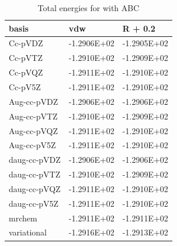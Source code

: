 \documentclass[../master_thesis.tex]{subfiles}
\begin{document}
\begin{table}[htbp]
\caption{Total energies for  with \ac{ABC}}
\begin{tabular}{|l|r|r|}
\hline
basis & \multicolumn{1}{l|}{vdw} & \multicolumn{1}{l|}{R + 0.2} \\ \hline
Cc-pVDZ & -1.2906E+02 & -1.2905E+02 \\ \hline
Cc-pVTZ & -1.2910E+02 & -1.2909E+02 \\ \hline
Cc-pVQZ & -1.2911E+02 & -1.2910E+02 \\ \hline
Cc-pV5Z & -1.2911E+02 & -1.2910E+02 \\ \hline
Aug-cc-pVDZ & -1.2906E+02 & -1.2906E+02 \\ \hline
Aug-cc-pVTZ & -1.2910E+02 & -1.2909E+02 \\ \hline
Aug-cc-pVQZ & -1.2911E+02 & -1.2910E+02 \\ \hline
Aug-cc-pV5Z & -1.2911E+02 & -1.2910E+02 \\ \hline
daug-cc-pVDZ & -1.2906E+02 & -1.2906E+02 \\ \hline
daug-cc-pVTZ & -1.2910E+02 & -1.2909E+02 \\ \hline
daug-cc-pVQZ & -1.2911E+02 & -1.2910E+02 \\ \hline
daug-cc-pV5Z & -1.2911E+02 & -1.2910E+02 \\ \hline
mrchem & -1.2911E+02 & -1.2911E+02 \\ \hline
variational & -1.2916E+02 & -1.2913E+02 \\ \hline
\end{tabular}
\label{tab:noprawdataabc}
\end{table}
\end{document}
